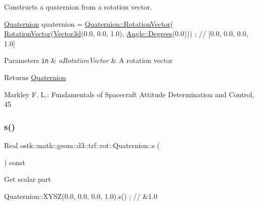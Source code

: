 Constructs a quaternion from a rotation vector. 


\begin{DoxyCode}
\hyperlink{classostk_1_1math_1_1geom_1_1d3_1_1trf_1_1rot_1_1_quaternion_ad9fd7d8eb5effb4d4e0394bbb5bb86dc}{Quaternion} quaternion = \hyperlink{classostk_1_1math_1_1geom_1_1d3_1_1trf_1_1rot_1_1_quaternion_aa5d053db4429218243bef0ed8967a4e7}{Quaternion::RotationVector}(
      \hyperlink{classostk_1_1math_1_1geom_1_1d3_1_1trf_1_1rot_1_1_quaternion_aa5d053db4429218243bef0ed8967a4e7}{RotationVector}(\hyperlink{namespaceostk_1_1math_1_1obj_a18744cbf433bce59f6758d9fe3b1dff1}{Vector3d}(0.0, 0.0, 1.0), \hyperlink{classostk_1_1math_1_1geom_1_1_angle_a2cefda601167af07f61f0477776203ca}{Angle::Degrees}(0.0))) ; \textcolor{comment}{//
       [0.0, 0.0, 0.0, 1.0]}
\end{DoxyCode}



\begin{DoxyParams}[1]{Parameters}
\mbox{\tt in}  & {\em a\+Rotation\+Vector} & A rotation vector \\
\hline
\end{DoxyParams}
\begin{DoxyReturn}{Returns}
\hyperlink{classostk_1_1math_1_1geom_1_1d3_1_1trf_1_1rot_1_1_quaternion}{Quaternion} 
\end{DoxyReturn}
Markley F. L.\+: Fundamentals of Spacecraft Attitude Determination and Control, 45 \mbox{\label{classostk_1_1math_1_1geom_1_1d3_1_1trf_1_1rot_1_1_quaternion_ab53045f72736712ac53e4def941a196a}} 
\subsubsection{\texorpdfstring{s()}{s()}}
{\footnotesize\ttfamily Real ostk\+::math\+::geom\+::d3\+::trf\+::rot\+::\+Quaternion\+::s (\begin{DoxyParamCaption}{ }\end{DoxyParamCaption}) const}

Get scalar part


\begin{DoxyCode}
Quaternion::XYSZ(0.0, 0.0, 0.0, 1.0).s() ; \textcolor{comment}{// &1.0}
\end{DoxyCode}



